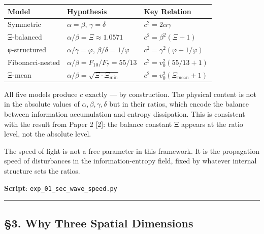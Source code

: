 \documentclass[
  11pt,
  a4paper]{article}
\begin{document}
\begin{longtable}[]{@{}
  >{\raggedright\arraybackslash}p{}
  >{\raggedright\arraybackslash}p{}
  >{\raggedright\arraybackslash}p{}@{}}
\toprule\noalign{}
\begin{minipage}[b]{\linewidth}\raggedright
Model
\end{minipage} & \begin{minipage}[b]{\linewidth}\raggedright
Hypothesis
\end{minipage} & \begin{minipage}[b]{\linewidth}\raggedright
Key Relation
\end{minipage} \\
\midrule\noalign{}
\endhead
\bottomrule\noalign{}
\endlastfoot
Symmetric & \(\alpha = \beta\), \(\gamma = \delta\) &
\(c^2 = 2\alpha\gamma\) \\
Ξ-balanced & \(\alpha/\beta = \Xi \approx 1.0571\) &
\(c^2 = \beta^2(\Xi + 1)\) \\
φ-structured & \(\alpha/\gamma = \varphi\), \(\beta/\delta = 1/\varphi\)
& \(c^2 = \gamma^2(\varphi + 1/\varphi)\) \\
Fibonacci-nested & \(\alpha/\beta = F_{10}/F_7 = 55/13\) &
\(c^2 = v_0^2(55/13 + 1)\) \\
Ξ-mean & \(\alpha/\beta = \sqrt{\Xi \cdot \Xi_\text{min}}\) &
\(c^2 = v_0^2(\Xi_\text{mean} + 1)\) \\
\end{longtable}

All five models produce \(c\) exactly --- by construction. The physical
content is not in the absolute values of
\(\alpha, \beta, \gamma, \delta\) but in their ratios, which encode the
balance between information accumulation and entropy dissipation. This
is consistent with the result from Paper 2 {[}2{]}: the balance constant
Ξ appears at the ratio level, not the absolute level.

The speed of light is not a free parameter in this framework. It is the
propagation speed of disturbances in the information-entropy field,
fixed by whatever internal structure sets the ratios.

\textbf{Script}: \texttt{exp\_01\_sec\_wave\_speed.py}

\begin{center}\rule{0.5\linewidth}{0.5pt}\end{center}

\subsection{§3. Why Three Spatial
Dimensions}\label{why-three-spatial-dimensions}
\end{document}
